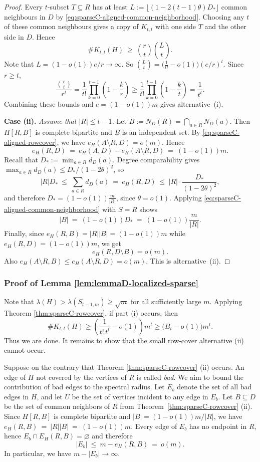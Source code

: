 \documentclass[11pt]{article}
\theoremstyle{definition}
\theoremstyle{plain}
\newcommand{\Ktt}{K_{t,t}}
\begin{document}
\begin{proof}
Every $t$-subset $T\subseteq R$ has at least
$L:=\lfloor (1-2(t-1)\theta)D_\ast\rfloor$ common neighbours in $D$ by \eqref{eq:sparseC-aligned-common-neighborhood}. 
Choosing any \(t\) of these common neighbours gives a copy of \(\Ktt\) with one side \(T\) and the other side in \(D\). Hence
\[
  \texttt{\#}\Ktt(H)\ \ge\ \binom{r}{t}\binom{L}{t}.
\]
Note that $L=(1-o(1))e/r\to\infty$. So $\binom{L}{t}=\bigl(\frac{1}{t!}-o(1)\bigr)(e/r)^t$.
Since $r\ge t$,
\[
  \frac{\binom{r}{t}}{r^t}
  =
  \frac{1}{t!}\prod_{k=0}^{t-1}\left(1-\frac{k}{r}\right)
  \ge \frac{1}{t!}\prod_{k=0}^{t-1}\left(1-\frac{k}{t}\right)
  =
  \frac{1}{t^t}.
\]
Combining these bounds and $e=(1-o(1))m$ gives alternative~\rm(i).

\smallskip
\noindent
{\bf  Case (ii).} 
\emph{Assume that $|R|\le t-1$.}
Let $B:=N_D(R)=\bigcap_{a\in R}N_D(a)$.
Then $H[R,B]$ is complete bipartite and $B$ is an independent set. 
By \eqref{eq:sparseC-aligned-rowcover}, we have $e_H(A\setminus R,D)=o(m)$. Hence
\[
  e_H(R,D)\ =\ e_H(A,D)-e_H(A\setminus R,D)\ =\ (1-o(1))m.
\]
Recall that $D_\ast:=\min_{a\in R}d_D(a)$.
Degree comparability gives $\max_{a\in R}d_D(a)\le D_\ast/(1-2\theta)^2$, so
\[
  |R| D_\ast\ \le\ \sum_{a\in R}d_D(a)\ =\ e_H(R,D)\ \le\ |R| \cdot \frac{D_\ast}{(1-2\theta)^2},
\]
and therefore $D_\ast=(1-o(1)) \frac{m}{|R|}$, since $\theta=o(1)$.
Applying \eqref{eq:sparseC-aligned-common-neighborhood} with $S=R$ shows
\[
  |B|\ =\ (1-o(1))D_\ast\ =\ (1-o(1))\frac{m}{|R|}.
\]
Finally, since $e_H(R,B)=|R||B|=(1-o(1))m$ while $e_H(R,D)=(1-o(1))m$, we get
\[
        e_H(R,D\setminus B)=o(m).
\]
Also $e_H(A\setminus R,B)\le e_H(A\setminus R,D)=o(m)$.
This is alternative~\rm(ii).
\end{proof}

\subsubsection{Proof of Lemma \ref{lem:lemmaD-localized-sparse}}
\label{sec:4-5-2}

Note that $\lambda(H)>\lambda(S_{t-1,m}) \ge \sqrt{m}$ for all sufficiently large \(m\). 
Applying Theorem \ref{thm:sparseC-rowcover}, 
if part \textup{(i)} occurs, then
\[
\texttt{\#}\Ktt(H)
     \ge 
    \left(\frac{1}{t!\,t^t}-o(1)\right) m^t
    \ge \big( B_t-o(1) \big) m^t.
\]
Thus we are done. It remains to show that the small row-cover alternative \textup{(ii)} cannot occur.

Suppose on the contrary that Theorem \ref{thm:sparseC-rowcover} \textup{(ii)} occurs. 
An edge of $H$ not covered by the vertices of $R$ is called {\it bad}. We aim to bound the contribution of bad edges to the spectral radius. 
Let $E_b$ denote the set of all bad edges in $H$, and let $U$ be the set of vertices incident to any edge in $E_b$. 
Let $B\subseteq D$ be the set of common neighbors of $R$ from
Theorem~\ref{thm:sparseC-rowcover} \textup{(ii)}.
Since $H[R,B]$ is complete bipartite and $|B|=(1-o(1))m/|R|$, we have $e_H(R,B)\ =\ |R||B|\ =\ (1-o(1))m.$ Every edge of $E_b$ has no endpoint in $R$, hence $E_b \cap E_H(R,B)=\varnothing$ and therefore
\[
 |E_b|\ \le\ m-e_H(R,B)\ =\ o(m).
\]
In particular, we have $m-|E_b|\to\infty$.
\end{document}
